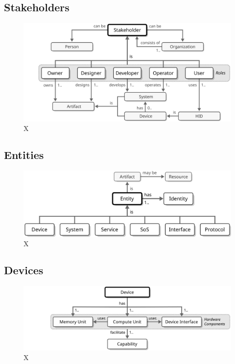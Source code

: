 %
%

\subsection{Stakeholders}

\begin{figure}[ht!]
  \centering
  \includegraphics{figures/stakeholder}
  \caption{
    X
  }
  \label{fig:stakeholder}
\end{figure}

\subsection{Entities}

\begin{figure}[ht!]
  \centering
  \includegraphics{figures/entity}
  \caption{
    X
  }
  \label{fig:entity}
\end{figure}

\subsection{Devices}

\begin{figure}[ht!]
  \centering
  \includegraphics{figures/device}
  \caption{
    X
  }
  \label{fig:device}
\end{figure}

